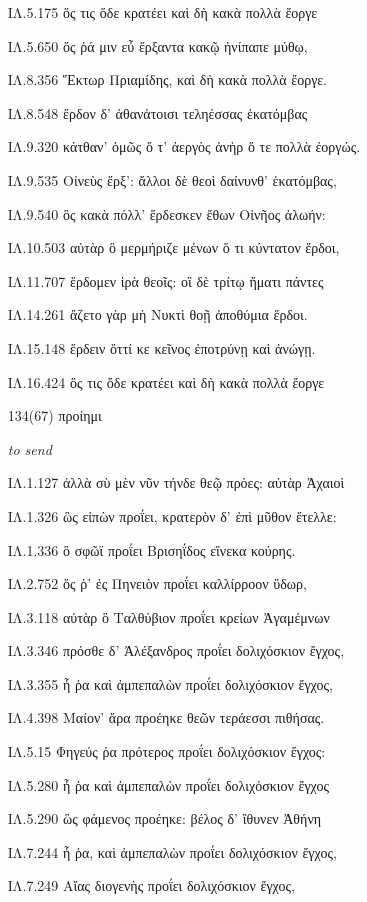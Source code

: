 \begin{enumerate}
{ΙΛ.5.175 ὅς τις ὅδε κρατέει καὶ δὴ κακὰ πολλὰ ἔοργε

ΙΛ.5.650 ὅς ῥά μιν εὖ ἕρξαντα κακῷ ἠνίπαπε μύθῳ,

ΙΛ.8.356 Ἕκτωρ Πριαμίδης, καὶ δὴ κακὰ πολλὰ ἔοργε.

ΙΛ.8.548 ἔρδον δ' ἀθανάτοισι τεληέσσας ἑκατόμβας

ΙΛ.9.320 κάτθαν' ὁμῶς ὅ τ' ἀεργὸς ἀνὴρ ὅ τε πολλὰ ἐοργώς.

ΙΛ.9.535 Οἰνεὺς ἔρξ': ἄλλοι δὲ θεοὶ δαίνυνθ' ἑκατόμβας,

ΙΛ.9.540 ὃς κακὰ πόλλ' ἕρδεσκεν ἔθων Οἰνῆος ἀλωήν:

ΙΛ.10.503 αὐτὰρ ὃ μερμήριζε μένων ὅ τι κύντατον ἕρδοι,

ΙΛ.11.707 ἕρδομεν ἱρὰ θεοῖς: οἳ δὲ τρίτῳ ἤματι πάντες

ΙΛ.14.261 ἅζετο γὰρ μὴ Νυκτὶ θοῇ ἀποθύμια ἕρδοι.

ΙΛ.15.148 ἕρδειν ὅττί κε κεῖνος ἐποτρύνῃ καὶ ἀνώγῃ.

ΙΛ.16.424 ὅς τις ὅδε κρατέει καὶ δὴ κακὰ πολλὰ ἔοργε

}

\clearpage
\item[\large 134(67)]{\large \g προίημι	}

\hspace{0.2cm} \textit{ to send }

{\g
ΙΛ.1.127 ἀλλὰ σὺ μὲν νῦν τήνδε θεῷ πρόες: αὐτὰρ Ἀχαιοὶ

ΙΛ.1.326 ὣς εἰπὼν προΐει, κρατερὸν δ' ἐπὶ μῦθον ἔτελλε:

ΙΛ.1.336 ὃ σφῶϊ προΐει Βρισηΐδος εἵνεκα κούρης.

ΙΛ.2.752 ὅς ῥ' ἐς Πηνειὸν προΐει καλλίρροον ὕδωρ,

ΙΛ.3.118 αὐτὰρ ὃ Ταλθύβιον προΐει κρείων Ἀγαμέμνων

ΙΛ.3.346 πρόσθε δ' Ἀλέξανδρος προΐει δολιχόσκιον ἔγχος,

ΙΛ.3.355 ἦ ῥα καὶ ἀμπεπαλὼν προΐει δολιχόσκιον ἔγχος,

ΙΛ.4.398 Μαίον' ἄρα προέηκε θεῶν τεράεσσι πιθήσας.

ΙΛ.5.15 Φηγεύς ῥα πρότερος προΐει δολιχόσκιον ἔγχος:

ΙΛ.5.280 ἦ ῥα καὶ ἀμπεπαλὼν προΐει δολιχόσκιον ἔγχος

ΙΛ.5.290 ὣς φάμενος προέηκε: βέλος δ' ἴθυνεν Ἀθήνη

ΙΛ.7.244 ἦ ῥα, καὶ ἀμπεπαλὼν προΐει δολιχόσκιον ἔγχος,

ΙΛ.7.249 Αἴας διογενὴς προΐει δολιχόσκιον ἔγχος,

}
\end{enumerate}
